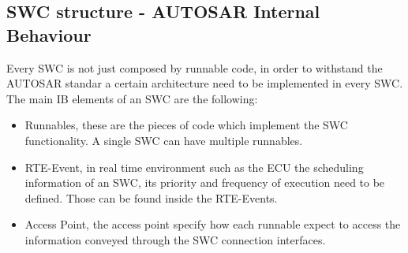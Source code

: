 \documentclass[../main.tex]{subfiles}
\begin{document}
\subsection{SWC structure - AUTOSAR Internal Behaviour}
Every SWC is not just composed by runnable code, in order to withstand the AUTOSAR standar a certain architecture need to be implemented in every SWC. The main IB elements of an SWC are the following:
\begin{itemize}
    \item Runnables, these are the pieces of code which implement the SWC functionality. A single SWC can have multiple runnables. 
    \item RTE-Event, in real time environment such as the ECU the scheduling information of an SWC, its priority and frequency of execution need to be defined. Those can be found inside the RTE-Events. 
    \item Access Point, the access point specify how each runnable expect to access the information conveyed through the SWC connection interfaces. 
\end{itemize}
\end{document}
